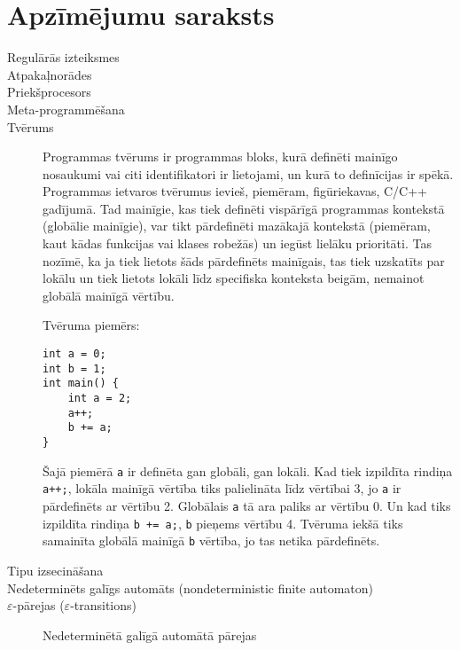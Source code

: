 \section*{Apzīmējumu saraksts}

\begin{description}
\item[Regulārās izteiksmes]


\item[Atpakaļnorādes]


\item[Priekšprocesors]


\item[Meta-programmēšana]



\item[Tvērums]
Programmas tvērums ir programmas bloks, kurā definēti mainīgo nosaukumi vai citi identifikatori ir lietojami, un kurā to definīcijas ir spēkā. Programmas ietvaros tvērumus ievieš, piemēram, figūriekavas, C/C++ gadījumā. Tad mainīgie, kas tiek definēti vispārīgā programmas kontekstā (globālie mainīgie), var tikt pārdefinēti mazākajā kontekstā (piemēram, kaut kādas funkcijas vai klases robežās) un iegūst lielāku prioritāti. Tas nozīmē, ka ja tiek lietots šāds pārdefinēts mainīgais, tas tiek uzskatīts par lokālu un tiek lietots lokāli līdz specifiska konteksta beigām, nemainot globālā mainīgā vērtību.

Tvēruma piemērs:
\begin{verbatim}
int a = 0;
int b = 1;
int main() {
    int a = 2;
    a++;
    b += a;
}
\end{verbatim}
Šajā piemērā \verb|a| ir definēta gan globāli, gan lokāli. Kad tiek izpildīta rindiņa \verb|a++;|, lokāla mainīgā vērtība tiks palielināta līdz vērtībai 3, jo \verb|a| ir pārdefinēts ar vērtību 2. Globālais \verb|a| tā ara paliks ar vērtību 0. Un kad tiks izpildīta rindiņa \verb|b += a;|, \verb|b| pieņems vērtību 4. Tvēruma iekšā tiks samainīta globālā mainīgā \verb|b| vērtība, jo tas netika pārdefinēts.

\item[Tipu izsecināšana]


\item[Nedeterminēts galīgs automāts (nondeterministic finite automaton)]


\item[$\varepsilon$-pārejas ($\varepsilon$-transitions)]
Nedeterminētā galīgā automātā pārejas



\end{description}

